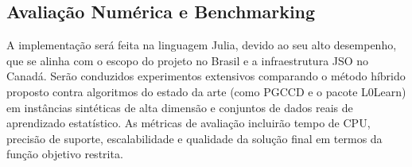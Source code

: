 \subsection{Avaliação Numérica e Benchmarking}
A implementação será feita na linguagem Julia, devido ao seu alto desempenho, que se alinha com o escopo do projeto no Brasil e a infraestrutura JSO no Canadá. Serão conduzidos experimentos extensivos comparando o método híbrido proposto contra algoritmos do estado da arte (como PGCCD e o pacote L0Learn) em instâncias sintéticas de alta dimensão e conjuntos de dados reais de aprendizado estatístico. As métricas de avaliação incluirão tempo de CPU, precisão de suporte, escalabilidade e qualidade da solução final em termos da função objetivo restrita.
